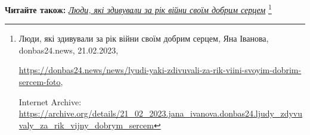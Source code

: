  
 
 
 
 


\textbf{Читайте також:} \href{https://archive.org/details/21_02_2023.jana_ivanova.donbas24.ljudy_zdyvuvaly_za_rik_vijny_dobrym_sercem}{\emph{Люди, які здивували за рік війни своїм добрим серцем}}%
\footnote{Люди, які здивували за рік війни своїм добрим серцем, Яна Іванова, donbas24.news, 21.02.2023, \par%
\url{https://donbas24.news/news/lyudi-yaki-zdivuvali-za-rik-viini-svoyim-dobrim-sercem-foto}, \par%
Internet Archive: \url{https://archive.org/details/21_02_2023.jana_ivanova.donbas24.ljudy_zdyvuvaly_za_rik_vijny_dobrym_sercem}%
}
